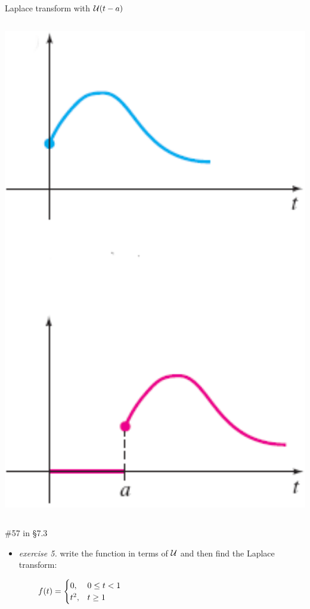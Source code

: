 \documentclass[urlcolor=blue,dvipsnames]{beamer}
\begin{document}
\begin{frame}{Laplace transform with $\mathcal{U}(t-a)$}
\begin{columns}
\begin{column}{0.2\textwidth}
\vspace{5mm}
\hspace{-5mm} \includegraphics[width=1.2\textwidth]{figs/fanditstrans}
\end{column}
\end{columns}
\end{frame}


\begin{frame}{\#57 in \S7.3}

\begin{itemize}
\item \emph{exercise 5.}  write the function in terms of $\mathcal{U}$ and then find the Laplace transform:

\vspace{-3mm}
    $$f(t) = \begin{cases} 0, & 0 \le t < 1 \\ t^2, & t\ge 1 \end{cases} \hspace{70mm}$$

\vspace{55mm}
\end{itemize}
\end{frame}
\end{document}
